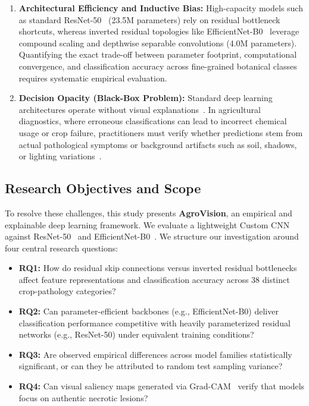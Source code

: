 \documentclass[journal]{IEEEtran}
\begin{document}
\begin{enumerate}
    \item \textbf{Architectural Efficiency and Inductive Bias:} High-capacity models such as standard ResNet-50~\cite{he2016} (23.5M parameters) rely on residual bottleneck shortcuts, whereas inverted residual topologies like EfficientNet-B0~\cite{tan2019} leverage compound scaling and depthwise separable convolutions (4.0M parameters). Quantifying the exact trade-off between parameter footprint, computational convergence, and classification accuracy across fine-grained botanical classes requires systematic empirical evaluation.
    \item \textbf{Decision Opacity (Black-Box Problem):} Standard deep learning architectures operate without visual explanations~\cite{selvaraju2017}. In agricultural diagnostics, where erroneous classifications can lead to incorrect chemical usage or crop failure, practitioners must verify whether predictions stem from actual pathological symptoms or background artifacts such as soil, shadows, or lighting variations~\cite{chouhan2020}.
\end{enumerate}

\subsection{Research Objectives and Scope}
To resolve these challenges, this study presents \textbf{AgroVision}, an empirical and explainable deep learning framework. We evaluate a lightweight Custom CNN against ResNet-50~\cite{he2016} and EfficientNet-B0~\cite{tan2019}. We structure our investigation around four central research questions:
\begin{itemize}
    \item \textbf{RQ1:} How do residual skip connections versus inverted residual bottlenecks affect feature representations and classification accuracy across 38 distinct crop-pathology categories?
    \item \textbf{RQ2:} Can parameter-efficient backbones (e.g., EfficientNet-B0) deliver classification performance competitive with heavily parameterized residual networks (e.g., ResNet-50) under equivalent training conditions?
    \item \textbf{RQ3:} Are observed empirical differences across model families statistically significant, or can they be attributed to random test sampling variance?
    \item \textbf{RQ4:} Can visual saliency maps generated via Grad-CAM~\cite{selvaraju2017} verify that models focus on authentic necrotic lesions?
\end{itemize}
\end{document}
